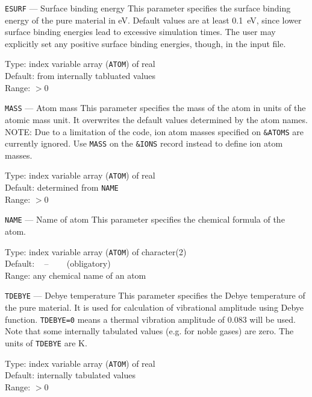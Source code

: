 \begin{keydescription}{\texttt{ESURF} --- Surface binding energy}
%
  This parameter specifies the surface binding energy of the pure material in
  eV. Default values are at least 0.1~eV, since lower surface binding energies 
  lead to excessive simulation times. The user may explicitly set any 
  positive surface binding energies, though, in the input file.
  \begin{keytab}
    Type:    \> index variable array (\texttt{ATOM}) of real \\
    Default: \> from internally tabluated values \\
    Range:   \> $> 0$
  \end{keytab}
\end{keydescription}

\begin{keydescription}{\texttt{MASS} --- Atom mass}
%
  This parameter specifies the mass of the atom in units of the
  atomic mass unit.  It overwrites the default values determined by
  the atom names. NOTE: Due to a limitation of the code, ion atom
  masses specified on \texttt{\&ATOMS} are currently ignored. Use 
  \texttt{MASS} on the \texttt{\&IONS} record instead to define ion
  atom masses.
%
  \begin{keytab}
    Type:    \> index variable array (\texttt{ATOM}) of real \\
    Default: \> determined from \texttt{NAME} \\
    Range: \> $> 0$
  \end{keytab}
\end{keydescription}

\begin{keydescription}{\texttt{NAME} --- Name of atom}
%
  This parameter specifies the chemical formula of the atom.
%
  \begin{keytab}
    Type:    \> index variable array (\texttt{ATOM}) of character(2) \\
    Default: \> ~ -- ~~~ (obligatory) \\
    Range:   \> any chemical name of an atom
  \end{keytab}
\end{keydescription}

\begin{keydescription}{\texttt{TDEBYE} --- Debye temperature}
%
  This parameter specifies the Debye temperature of the pure material. It is used
  for calculation of vibrational amplitude using Debye function.  
  \texttt{TDEBYE=0} means a thermal vibration amplitude of 0.083 will be used. 
  Note that some internally tabulated values (e.g. for noble gases) are zero.
  The units of \texttt{TDEBYE} are K.
%
  \begin{keytab}
    Type:    \> index variable array (\texttt{ATOM}) of real \\
    Default: \> internally tabulated values \\
    Range:   \> $> 0$
  \end{keytab}
\end{keydescription}

